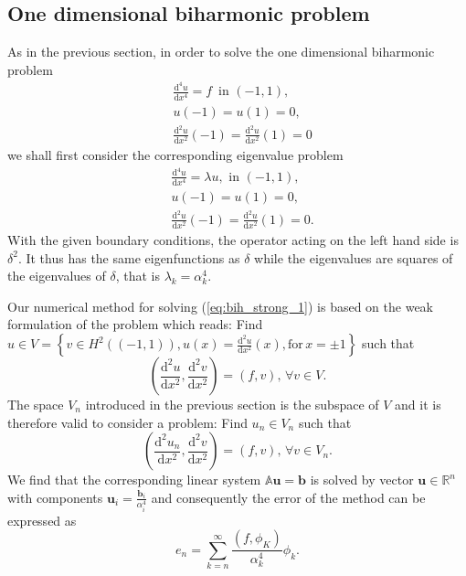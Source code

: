 \documentclass[a4paper,10pt]{article}
\newcommand{\R}{\ensuremath{\mathbb{R}}}
\newcommand{\inner}[2]{\ensuremath{\left(#1, #2\right)}}
\newcommand{\deriv}[2]{\ensuremath{\frac{\mathrm{d}#1}{\mathrm{d}#2}}}
\begin{document}
  \subsection{One dimensional biharmonic problem}
  As in the previous section, in order to solve the one dimensional biharmonic
  problem
  \begin{equation}
  \label{eq:bih_strong_1}
  \begin{aligned}
    &\deriv{^4u}{x^4} = f\,\text{ in }(-1, 1),\\
    &u(-1) = u(1) = 0,\\
    &\deriv{^2u}{x^2}(-1) = \deriv{^2u}{x^2}(1) = 0
  \end{aligned}
  \end{equation}
  we shall first consider the corresponding eigenvalue problem
  \begin{equation}
  \begin{aligned}
    &\deriv{^4u}{x^4} = \lambda u,\text{ in }(-1, 1),\\
    &u(-1) = u(1) = 0,\\
    &\deriv{^2u}{x^2}(-1) = \deriv{^2u}{x^2}(1) = 0.
  \end{aligned}
  \end{equation}
  With the given boundary conditions, the operator acting on the left hand
  side is $\delta^2$. It thus has the same eigenfunctions as $\delta$ while
  the eigenvalues are squares of the eigenvalues of $\delta$, that is
  $\lambda_k=\alpha_k^4$.
  
  Our numerical method for solving (\ref{eq:bih_strong_1}) is based on the 
  weak formulation of the problem which reads: Find $u\in V=\left\{v\in
  H^2((-1, 1)), u(x)=\deriv{^2u}{x^2}(x),\text{for}\,x=\pm 1\right\}$ such that
  \[
    \inner{\deriv{^2u}{x^2}}{\deriv{^2v}{x^2}} = \inner{f}{v},\,\forall v\in V.
  \]
  The space $V_n$ introduced in the previous section is the subspace of $V$
  and it is therefore valid to consider a problem: Find $u_n\in V_n$ such that
  \begin{equation}
    \label{eq:bih_weak_1}
    \inner{\deriv{^2u_n}{x^2}}{\deriv{^2v}{x^2}} = \inner{f}{v},\,\forall v\in V_n.
  \end{equation}
  We find that the corresponding linear system $\mathbb{A}\mathbf{u}=\mathbf{b}$
  is solved by vector $\mathbf{u}\in\R^n$ with components
  $\mathbf{u}_i=\frac{\mathbf{b}_i}{\alpha_i^4}$ and consequently the error of the
  method can be expressed as
  \[
    e_n = \sum_{k=n}^{\infty} \frac{\inner{f}{\phi_K}}{\alpha_k^4} \phi_k.
  \]
\end{document}
